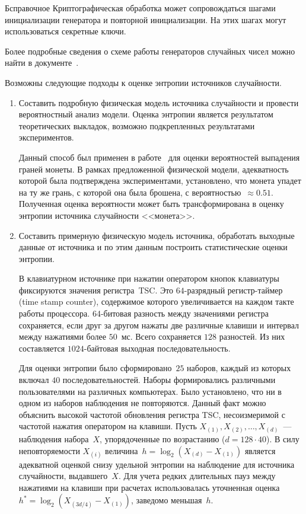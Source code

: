 \begin{appendix}{Б}{справочное}
Криптографическая обработка может сопровождаться шагами инициализации 
генератора и повторной инициализации. На этих шагах могут использоваться 
секретные ключи.

Более подробные сведения о схеме работы генераторов случайных чисел 
можно найти в документе~\cite{AIS31}.


Возможны следующие подходы к оценке энтропии источников случайности.

\begin{enumerate}
\item 
Составить подробную физическая модель источника 
случайности и провести вероятностный анализ модели. Оценка энтропии 
является результатом теоретических выкладок, возможно подкрепленных 
результатами экспериментов. 

\begin{example}
Данный способ был применен в работе~\cite{DHM07} для оценки вероятностей
выпадения граней монеты. 
%
В рамках предложенной физической модели, адекватность
которой была подтверждена экспериментами, установлено, что монета упадет на
ту же грань, с которой она была брошена, с вероятностью~$\approx 0.51$.
%
Полученная оценка вероятности может быть трансформирована в оценку энтропии
источника случайности <<монета>>.
\end{example}

\item 
Составить примерную физическую модель источника, 
обработать выходные данные от источника и по этим данным построить
статистические оценки энтропии. 

\begin{example}
В клавиатурном источнике при нажатии оператором кнопок клавиатуры фиксируются 
значения регистра~TSC. Это $64$-разрядный регистр-таймер (time stamp counter), 
содержимое которого увеличивается на каждом такте работы процессора.
%
%
64-битовая разность между значениями регистра сохраняется, если друг за другом 
нажаты две различные клавиши и интервал между нажатиями более $50$~мс. 
Всего сохраняется $128$ разностей. Из них составляется $1024$-байтовая 
выходная последовательность.

Для оценки энтропии было сформировано~$25$ наборов, 
каждый из которых включал $40$ последовательностей.
%
Наборы формировались различными пользователями на различных компьютерах. 
%
Было установлено, что ни в одном из наборов наблюдения не повторяются.
Данный факт можно объяснить высокой частотой обновления регистра TSC,
несоизмеримой с частотой нажатия оператором на клавиши.
%
Пусть $X_{(1)},X_{(2)},\ldots,X_{(d)}$~--- наблюдения набора~$X$, 
упорядоченные по возрастанию ($d=128\cdot 40$). 
%
В силу неповторяемости $X_{(i)}$ величина~$h=\log_2(X_{(d)}-X_{(1)})$
является адекватной оценкой снизу удельной энтропии на наблюдение для 
источника случайности, выдавшего~$X$.
%
Для учета редких длительных пауз между нажатиями на клавиши
при расчетах использовалась уточненная оценка $h^*=\log_2(X_{(3d/4)}-X_{(1)})$,
заведомо меньшая~$h$.


\end{example}
\end{enumerate}
\end{appendix}
